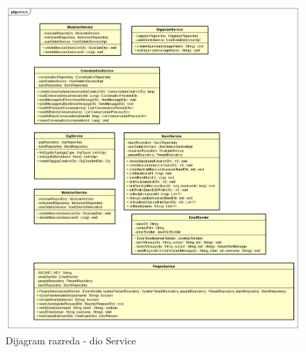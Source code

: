 		\begin{figure}[H]
			\begin{center}
				\includegraphics[width=17cm]{slike/service.PNG}
			\end{center}
			\caption{Dijagram razreda - dio Service}
			\label{fig:service}
		\end{figure}
	
